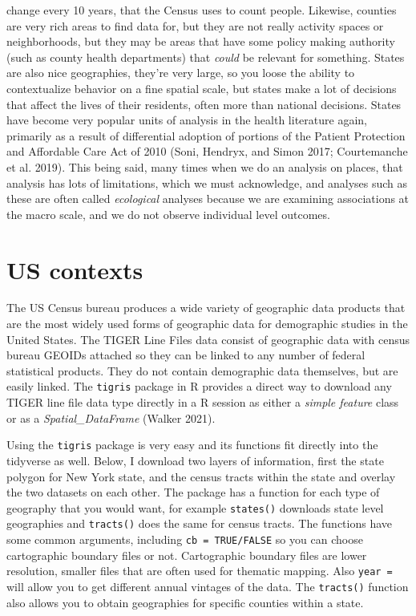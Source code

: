 \documentclass[
  letterpaper,
  DIV=11,
  numbers=noendperiod]{scrreprt}
\begin{document}
change every 10 years, that the Census uses to count people. Likewise,
counties are very rich areas to find data for, but they are not really
activity spaces or neighborhoods, but they may be areas that have some
policy making authority (such as county health departments) that
\emph{could} be relevant for something. States are also nice
geographies, they're very large, so you loose the ability to
contextualize behavior on a fine spatial scale, but states make a lot of
decisions that affect the lives of their residents, often more than
national decisions. States have become very popular units of analysis in
the health literature again, primarily as a result of differential
adoption of portions of the Patient Protection and Affordable Care Act
of 2010 (Soni, Hendryx, and Simon 2017; Courtemanche et al. 2019). This
being said, many times when we do an analysis on places, that analysis
has lots of limitations, which we must acknowledge, and analyses such as
these are often called \emph{ecological} analyses because we are
examining associations at the macro scale, and we do not observe
individual level outcomes.

\hypertarget{us-contexts}{%
\section{US contexts}\label{us-contexts}}

The US Census bureau produces a wide variety of geographic data products
that are the most widely used forms of geographic data for demographic
studies in the United States. The TIGER Line Files data consist of
geographic data with census bureau GEOIDs attached so they can be linked
to any number of federal statistical products. They do not contain
demographic data themselves, but are easily linked. The \texttt{tigris}
package in R provides a direct way to download any TIGER line file data
type directly in a R session as either a \emph{simple feature} class or
as a \emph{Spatial\_DataFrame} (Walker 2021).

Using the \texttt{tigris} package is very easy and its functions fit
directly into the tidyverse as well. Below, I download two layers of
information, first the state polygon for New York state, and the census
tracts within the state and overlay the two datasets on each other. The
package has a function for each type of geography that you would want,
for example \texttt{states()} downloads state level geographies and
\texttt{tracts()} does the same for census tracts. The functions have
some common arguments, including \texttt{cb\ =\ TRUE/FALSE} so you can
choose cartographic boundary files or not. Cartographic boundary files
are lower resolution, smaller files that are often used for thematic
mapping. Also \texttt{year\ =} will allow you to get different annual
vintages of the data. The \texttt{tracts()} function also allows you to
obtain geographies for specific counties within a state.
\end{document}
